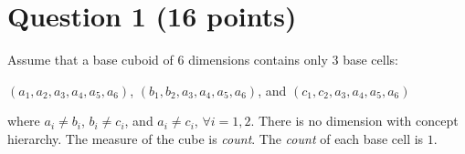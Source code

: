 

\usepackage{amsmath}
\setlength{\parindent}{0pt}
\usepackage{graphicx}
\usepackage{float}
\usepackage{bigstrut}

\usepackage{listings}
\usepackage{color}
\usepackage[utf8]{inputenc}




\oddsidemargin 0in
\evensidemargin 0in
\textwidth 6.5in
\topmargin -0.5in
\textheight 9.0in
\usepackage{multirow}
\usepackage{hyperref}

\hypersetup{colorlinks=true}
\usepackage{color}

\newcommand{\ans}[1]{}







\section*{Question 1 (16 points)}
Assume that a base cuboid of 6 dimensions contains only 3 base cells:
\begin{center}
$(a_1, a_2, a_3, a_4,a_5,a_6)$, $(b_1, b_2, a_3, a_4,a_5,a_6)$, and $(c_1, c_2, a_3, a_4,a_5,a_6)$
\end{center}
where $a_i \neq b_i$, $b_i \neq c_i$, and $a_i \neq c_i$,  $\forall i = 1,2$. There is no dimension with concept hierarchy. The measure of the cube is {\it count}. The {\it count} of each base cell is $1$.\\

